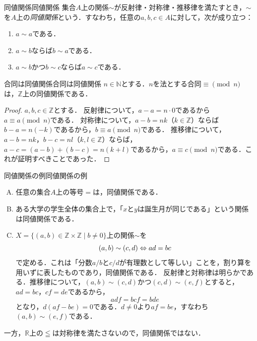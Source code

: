 \begin{definition}{同値関係}{同値関係}
  集合$A$上の関係$\sim$が反射律・対称律・推移律を満たすとき，$\sim$を$A$上の\emph{同値関係}という．すなわち，任意の$a, b, c \in A$に対して，次が成り立つ：
  \begin{enumerate}[label=(\roman*),leftmargin=3.2em]
    \item $a \sim a$である．
    \item $a \sim b$ならば$b \sim a$である．
    \item $a \sim b$かつ$b \sim c$ならば$a \sim c$である．
  \end{enumerate}
\end{definition}

\begin{prop}{合同は同値関係}{合同は同値関係}
  $n \in \mathbb{N}$とする．$n$を法とする合同$\equiv \pmod{n}$は，$\mathbb{Z}$上の同値関係である．
\end{prop}

\begin{tleftbar}
  \begin{proof}
    $a, b, c \in \mathbb{Z}$とする．
    反射律について，$a - a = n \cdot 0$であるから$a \equiv a \pmod{n}$である．
    対称律について，$a - b = nk$（$k \in \mathbb{Z}$）ならば$b - a = n(-k)$であるから，$b \equiv a \pmod{n}$である．
    推移律について，$a - b = nk$，$b - c = nl$（$k, l \in \mathbb{Z}$）ならば，$a - c = (a - b) + (b - c) = n(k + l)$であるから，$a \equiv c \pmod{n}$である．これが証明すべきことであった．
  \end{proof}
\end{tleftbar}

\begin{example}{同値関係の例}{同値関係の例}
  \begin{enumerate}[(A)]
    \item 任意の集合$A$上の等号$=$は，同値関係である．
    \item ある大学の学生全体の集合上で，「$x$と$y$は誕生月が同じである」という関係は同値関係である．
    \item $X = \{ (a, b) \in \mathbb{Z} \times \mathbb{Z} \mid b \ne 0 \}$上の関係$\sim$を
          \[
            (a, b) \sim (c, d) \mathrel{\Leftrightarrow} ad = bc
          \]
          で定める．これは「分数$a/b$と$c/d$が有理数として等しい」ことを，割り算を用いずに表したものであり，同値関係である．
          反射律と対称律は明らかである．推移律について，$(a, b) \sim (c, d)$かつ$(c, d) \sim (e, f)$とすると，$ad = bc$，$cf = de$であるから，
          \[
            adf = bcf = bde
          \]
          となり，$d(af - be) = 0$である．$d \ne 0$より$af = be$，すなわち$(a, b) \sim (e, f)$である．
  \end{enumerate}
  一方，$\mathbb{R}$上の$\leqq$は対称律を満たさないので，同値関係ではない．
\end{example}

